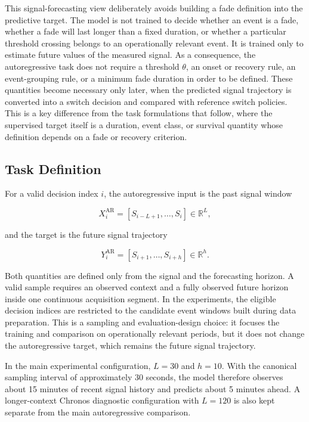 This signal-forecasting view deliberately avoids building a fade definition
into the predictive target. The model is not trained to decide whether an event
is a fade, whether a fade will last longer than a fixed duration, or whether a
particular threshold crossing belongs to an operationally relevant event. It is
trained only to estimate future values of the measured signal. As a consequence,
the autoregressive task does not require a threshold \(\theta\), an onset or
recovery rule, an event-grouping rule, or a minimum fade duration in order to be
defined. These quantities become necessary only later, when the predicted signal
trajectory is converted into a switch decision and compared with reference
switch policies. This is a key difference from the task formulations that
follow, where the supervised target itself is a duration, event class, or
survival quantity whose definition depends on a fade or recovery criterion.

\subsection{Task Definition}

For a valid decision index \(i\), the autoregressive input is the past signal
window

\[
  X_i^{\text{AR}} = [S_{i-L+1}, \ldots, S_i] \in \mathbb{R}^{L},
\]

and the target is the future signal trajectory

\[
  Y_i^{\text{AR}} = [S_{i+1}, \ldots, S_{i+h}] \in \mathbb{R}^{h}.
\]

Both quantities are defined only from the signal and the forecasting horizon.
A valid sample requires an observed context and a fully observed future horizon
inside one continuous acquisition segment. In the experiments, the eligible
decision indices are restricted to the candidate event windows built during data
preparation. This is a sampling and evaluation-design choice: it focuses the
training and comparison on operationally relevant periods, but it does not
change the autoregressive target, which remains the future signal trajectory.

In the main experimental configuration, \(L=30\) and \(h=10\). With the
canonical sampling interval of approximately 30 seconds, the model therefore
observes about 15 minutes of recent signal history and predicts about 5 minutes
ahead. A longer-context Chronos diagnostic configuration with \(L=120\) is also
kept separate from the main autoregressive comparison.

